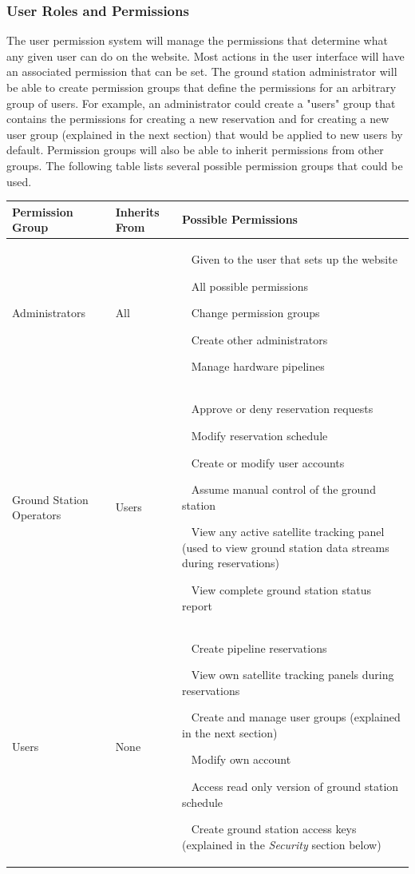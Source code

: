 \documentclass{mxl-design}
\begin{document}
\subsubsection{User Roles and Permissions}
The user permission system will manage the permissions that determine what any given user can do on the website. Most actions in the user interface will have an associated permission that can be set. The ground station administrator will be able to create permission groups that define the permissions for an arbitrary group of users. For example, an administrator could create a "users" group that contains the permissions for creating a new reservation and for creating a new user group (explained in the next section) that would be applied to new users by default. Permission groups will also be able to inherit permissions from other groups. The following table lists several possible permission groups that could be used.

\begin{table}[H]
\begin{center}
{\renewcommand{\arraystretch}{1.5}
\begin{tabular}{p{2in}|p{1in}|p{3in}}
	\bf Permission Group & \bf Inherits From & \bf Possible Permissions \\ 
	\hline
		Administrators 
	&
		All
	&
		\textbullet~ Given to the user that sets up the website \par
		\textbullet~ All possible permissions \par
		\textbullet~ Change permission groups \par
		\textbullet~ Create other administrators \par
		\textbullet~ Manage hardware pipelines
	\\ \hline
		Ground Station Operators
	&
		Users
	&
		\textbullet~ Approve or deny reservation requests \par
		\textbullet~ Modify reservation schedule \par
		\textbullet~ Create or modify user accounts \par
		\textbullet~ Assume manual control of the ground station \par
		\textbullet~ View any active satellite tracking panel (used to view ground station data streams during reservations) \par
		\textbullet~ View complete ground station status report
	\\ \hline
		Users
	&
		None
	&
		\textbullet~ Create pipeline reservations \par
		\textbullet~ View own satellite tracking panels during reservations \par
		\textbullet~ Create and manage user groups (explained in the next section) \par
		\textbullet~ Modify own account \par
		\textbullet~ Access read only version of ground station schedule \par
		\textbullet~ Create ground station access keys (explained in the \textit{Security} section below)
	\\
\end{tabular}}
\end{center}
\end{table}
\end{document}
